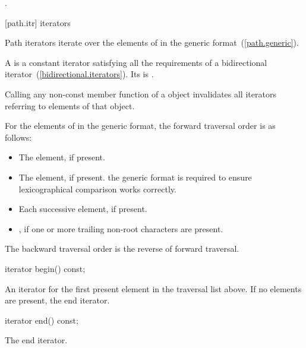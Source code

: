 \begin{itemdescr}
\pnum
\returns {}.
\end{itemdescr}

[path.itr]{ iterators}

\pnum
Path iterators iterate over the elements of 
in the generic format~(\ref{path.generic}).

\pnum
A  is a constant iterator satisfying all the
requirements of a bidirectional iterator~(\ref{bidirectional.iterators}).
Its  is .

\pnum
Calling any non-const member function of a  object
invalidates all iterators referring to elements of that object.

\pnum
For the elements of  in the generic format,
the forward traversal order is as follows:
\begin{itemize}
\item The  element, if present.
\item The  element, if present.
\enternote
the generic format is required to ensure lexicographical
comparison works correctly. \exitnote
\item Each successive  element, if present.
\item {}, if one or more trailing non-root 
characters are present.
\end{itemize}

\pnum
The backward traversal order is the reverse of forward traversal.

\begin{itemdecl}
iterator begin() const;
\end{itemdecl}

\begin{itemdescr}
\pnum
\returns An iterator for the first present element in the traversal
list above. If no elements are present, the end iterator.
\end{itemdescr}

\begin{itemdecl}
iterator end() const;
\end{itemdecl}

\begin{itemdescr}
\pnum
\returns The end iterator.
\end{itemdescr}

